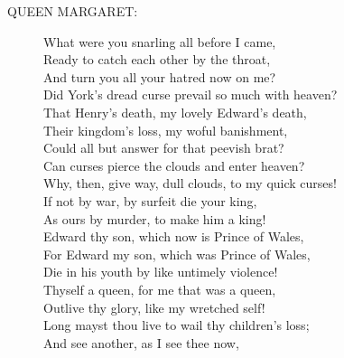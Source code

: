 \documentclass{article}
\begin{document}
\begin{description}
\item[QUEEN MARGARET:] 
\hspace{1pt}What were you snarling all before I came,\\
\hspace{1pt}Ready to catch each other by the throat,\\
\hspace{1pt}And turn you all your hatred now on me?\\
\hspace{1pt}Did York's dread curse prevail so much with heaven?\\
\hspace{1pt}That Henry's death, my lovely Edward's death,\\
\hspace{1pt}Their kingdom's loss, my woful banishment,\\
\hspace{1pt}Could all but answer for that peevish brat?\\
\hspace{1pt}Can curses pierce the clouds and enter heaven?\\
\hspace{1pt}Why, then, give way, dull clouds, to my quick curses!\\
\hspace{1pt}If not by war, by surfeit die your king,\\
\hspace{1pt}As ours by murder, to make him a king!\\
\hspace{1pt}Edward thy son, which now is Prince of Wales,\\
\hspace{1pt}For Edward my son, which was Prince of Wales,\\
\hspace{1pt}Die in his youth by like untimely violence!\\
\hspace{1pt}Thyself a queen, for me that was a queen,\\
\hspace{1pt}Outlive thy glory, like my wretched self!\\
\hspace{1pt}Long mayst thou live to wail thy children's loss;\\
\hspace{1pt}And see another, as I see thee now,\\

\end{description}
\end{document}

